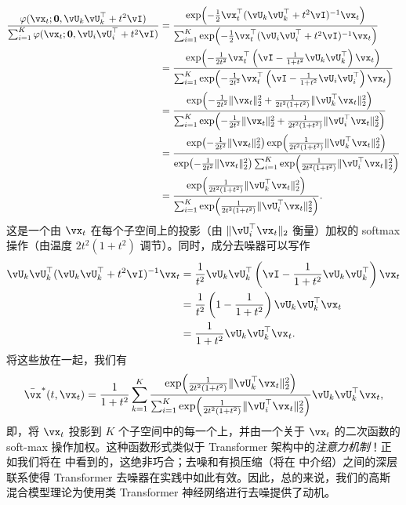 \documentclass[../../book-main_zh.tex]{subfiles}
\begin{document}
\begin{align}
	\frac{\phi(\vx_{t} ; \vzero, \vU_{k}\vU_{k}^{\top} + t^{2}\vI)}{\sum_{i
	= 1}^{K}\phi(\vx_{t} ; \vzero, \vU_{i}\vU_{i}^{\top} + t^{2}\vI)} 
	&= \frac{\exp\rp{-\frac{1}{2}\vx_{t}^{\top}(\vU_{k}\vU_{k}^{\top} + t^{2}\vI)^{-1}\vx_{t}}}{\sum_{i = 1}^{K}\exp\rp{-\frac{1}{2}\vx_{t}^{\top}(\vU_{i}\vU_{i}^{\top} + t^{2}\vI)^{-1}\vx_{t}}} \\
	&= \frac{\exp\rp{-\frac{1}{2t^{2}}\vx_{t}^{\top}\bp{\vI - \frac{1}{1 + t^{2}}\vU_{k}\vU_{k}^{\top}}\vx_{t}}}{\sum_{i = 1}^{K}\exp\rp{-\frac{1}{2t^{2}}\vx_{t}^{\top}\bp{\vI - \frac{1}{1 + t^{2}}\vU_{i}\vU_{i}^{\top}}\vx_{t}}} \\
	&= \frac{\exp\rp{-\frac{1}{2t^{2}}\norm{\vx_{t}}_{2}^{2} + \frac{1}{2t^{2}(1 + t^{2})}\norm{\vU_{k}^{\top}\vx_{t}}_{2}^{2}}}{\sum_{i = 1}^{K}\exp\rp{-\frac{1}{2t^{2}}\norm{\vx_{t}}_{2}^{2} + \frac{1}{2t^{2}(1 + t^{2})}\norm{\vU_{i}^{\top}\vx_{t}}_{2}^{2}}} \\
	&= \frac{\exp\rp{-\frac{1}{2t^{2}}\norm{\vx_{t}}_{2}^{2}}\exp\rp{\frac{1}{2t^{2}(1 + t^{2})}\norm{\vU_{k}^{\top}\vx_{t}}_{2}^{2}}}{\exp\rp{-\frac{1}{2t^{2}}\norm{\vx_{t}}_{2}^{2}}\sum_{i = 1}^{K}\exp\rp{\frac{1}{2t^{2}(1 + t^{2})}\norm{\vU_{i}^{\top}\vx_{t}}_{2}^{2}}} \\
	&= \frac{\exp\rp{\frac{1}{2t^{2}(1 + t^{2})}\norm{\vU_{k}^{\top}\vx_{t}}_{2}^{2}}}{\sum_{i = 1}^{K}\exp\rp{\frac{1}{2t^{2}(1 + t^{2})}\norm{\vU_{i}^{\top}\vx_{t}}_{2}^{2}}}.
\end{align}
这是一个由 \(\vx_{t}\) 在每个子空间上的投影（由 \(\norm{\vU_{i}^{\top}\vx_{t}}_{2}\) 衡量）加权的 softmax 操作（由温度 \(2t^{2}(1 + t^{2})\) 调节）。同时，成分去噪器可以写作
\begin{align}
	\vU_{k}\vU_{k}^{\top}(\vU_{k}\vU_{k}^{\top} + t^{2}\vI)^{-1}\vx_{t} 
	&= \frac{1}{t^{2}}\vU_{k}\vU_{k}^{\top}\bp{\vI - \frac{1}{1 + t^{2}}\vU_{k}\vU_{k}^{\top}}\vx_{t} \\
	&= \frac{1}{t^{2}}\bp{1 - \frac{1}{1 + t^{2}}}\vU_{k}\vU_{k}^{\top}\vx_{t} \\
	&= \frac{1}{1 + t^{2}}\vU_{k}\vU_{k}^{\top}\vx_{t}.
\end{align}
将这些放在一起，我们有
\begin{equation}\label{eq:gmm_lowrank_denoiser}
	\bar{\vx}^{\ast}(t, \vx_{t}) = \frac{1}{1 + t^{2}}\sum_{k = 1}^{K}\frac{\exp\rp{\frac{1}{2t^{2}(1 + t^{2})}\norm{\vU_{k}^{\top}\vx_{t}}_{2}^{2}}}{\sum_{i = 1}^{K}\exp\rp{\frac{1}{2t^{2}(1 + t^{2})}\norm{\vU_{i}^{\top}\vx_{t}}_{2}^{2}}}\vU_{k}\vU_{k}^{\top}\vx_{t},
\end{equation}
即，将 \(\vx_{t}\) 投影到 \(K\) 个子空间中的每一个上，并由一个关于 \(\vx_{t}\) 的二次函数的 soft-max 操作加权。这种函数形式类似于 Transformer 架构中的\textit{注意力机制}！正如我们将在  中看到的，这绝非巧合；去噪和有损压缩（将在  中介绍）之间的深层联系使得 Transformer 去噪器在实践中如此有效。因此，总的来说，我们的高斯混合模型理论为使用类 Transformer 神经网络进行去噪提供了动机。
\end{document}
